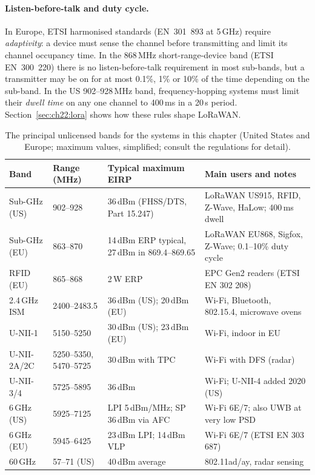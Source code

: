 
\paragraph{Listen-before-talk and duty cycle.} In Europe, ETSI harmonised standards (EN~301~893 at
5\,GHz) require \emph{adaptivity}: a device must sense the channel before transmitting and limit
its channel occupancy time. In the 868\,MHz short-range-device band (ETSI EN~300~220) there is no
listen-before-talk requirement in most sub-bands, but a transmitter may be on for at most 0.1\%,
1\% or 10\% of the time depending on the sub-band. In the US 902--928\,MHz band, frequency-hopping
systems must limit their \emph{dwell time} on any one channel to 400\,ms in a 20\,s period.
Section~\ref{sec:ch22:lora} shows how these rules shape LoRaWAN.

\begin{table}[htbp]\centering\footnotesize
\caption{The principal unlicensed bands for the systems in this chapter (United States and
Europe; maximum values, simplified; consult the regulations for detail).}
\label{tab:ch22:bands}
\begin{tabularx}{\linewidth}{@{}l l l X@{}}
\toprule
Band & Range (MHz) & Typical maximum EIRP & Main users and notes\\
\midrule
Sub-GHz (US) & 902--928 & 36\,dBm (FHSS/DTS, Part 15.247) & LoRaWAN US915, RFID, Z-Wave, HaLow; 400\,ms dwell\\
Sub-GHz (EU) & 863--870 & 14\,dBm ERP typical, 27\,dBm in 869.4--869.65 & LoRaWAN EU868, Sigfox, Z-Wave; 0.1--10\% duty cycle\\
RFID (EU) & 865--868 & 2\,W ERP & EPC Gen2 readers (ETSI EN 302 208)\\
2.4\,GHz ISM & 2400--2483.5 & 36\,dBm (US); 20\,dBm (EU) & Wi-Fi, Bluetooth, 802.15.4, microwave ovens\\
U-NII-1 & 5150--5250 & 30\,dBm (US); 23\,dBm (EU) & Wi-Fi, indoor in EU\\
U-NII-2A/2C & 5250--5350, 5470--5725 & 30\,dBm with TPC & Wi-Fi with DFS (radar)\\
U-NII-3/4 & 5725--5895 & 36\,dBm & Wi-Fi; U-NII-4 added 2020 (US)\\
6\,GHz (US) & 5925--7125 & LPI 5\,dBm/MHz; SP 36\,dBm via AFC & Wi-Fi 6E/7; also UWB at very low PSD\\
6\,GHz (EU) & 5945--6425 & 23\,dBm LPI; 14\,dBm VLP & Wi-Fi 6E/7 (ETSI EN 303 687)\\
60\,GHz & 57--71 (US) & 40\,dBm average & 802.11ad/ay, radar sensing\\
\bottomrule
\end{tabularx}
\end{table}

